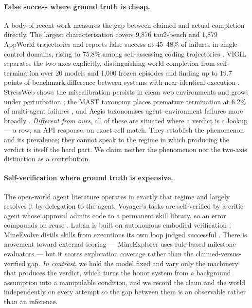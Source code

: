 \documentclass[11pt]{article}
\newcommand{\runin}[1]{\paragraph{#1}}
\begin{document}
\runin{False success where ground truth is cheap.}
A body of recent work measures the gap between claimed and actual
completion directly. The largest characterisation covers 9,876
tau2-bench and 1,879 AppWorld trajectories and reports false success at
45--48\% of failures in single-control domains, rising to 75.8\% among
self-assessing coding trajectories \citep{falsesuccess}. VIGIL
separates the two axes explicitly, distinguishing world completion from
self-termination over 20 models and 1,000 frozen episodes and finding up
to 19.7 points of benchmark difference between systems with
near-identical execution \citep{vigil}. StressWeb shows the
miscalibration persists in clean web environments and grows under
perturbation \citep{stressweb}; the MAST taxonomy places premature
termination at 6.2\% of multi-agent failures \citep{mast}, and Aegis
taxonomises agent--environment failures more broadly \citep{aegis}.
\emph{Different from ours}, all of these are situated where a verdict is
a lookup --- a row, an API response, an exact cell match. They establish
the phenomenon and its prevalence; they cannot speak to the regime in
which producing the verdict is itself the hard part. We claim neither
the phenomenon nor the two-axis distinction as a contribution.

\runin{Self-verification where ground truth is expensive.}
The open-world agent literature operates in exactly that regime and
largely resolves it by delegation to the agent. Voyager's tasks are
self-verified by a critic agent whose approval admits code to a
permanent skill library, so an error compounds on reuse
\citep{voyager}. Luban is built on autonomous embodied verification
\citep{luban}; MineEvolve distils skills from executions its own loop
judged successful \citep{mineevolve}. There is movement toward external
scoring --- MineExplorer uses rule-based milestone evaluators
\citep{mineexplorer} --- but it scores exploration coverage rather than
the claimed-versus-verified gap. \emph{In contrast}, we hold the model
fixed and vary only the machinery that produces the verdict, which turns
the honor system from a background assumption into a manipulable
condition, and we record the claim and the world independently on every
attempt so the gap between them is an observable rather than an
inference.
\end{document}
